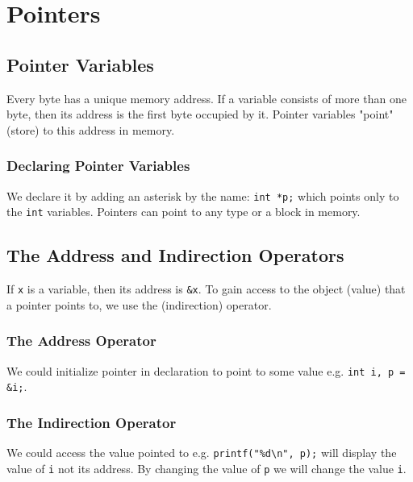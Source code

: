 \documentclass[openany]{book}
\begin{document}
    \chapter{Pointers}

    \section{Pointer Variables}
    Every byte has a unique memory address. If a variable consists of more than one byte, then its address is the first byte occupied by it. Pointer variables "point" (store) to this address in memory.

    \subsection*{Declaring Pointer Variables}
    We declare it by adding an asterisk by the name: \texttt{int *p;} which points only to the
    \texttt{int} variables. Pointers can point to any type or a block in memory.

    \section{The Address and Indirection Operators}
    If \texttt{x} is a variable, then its address is \texttt{\&x}. To gain access to the object
    (value) that a pointer points to, we use the \texttt{} (indirection) operator.

    \subsection*{The Address Operator}
    We could initialize pointer in declaration to point to some value e.g. \texttt{int i, p = \&i;}.

    \subsection*{The Indirection Operator}
    We could access the value pointed to e.g. \texttt{printf("\%d\textbackslash n", p);} will
    display the value of \texttt{i} not its address. By changing the value of \texttt{p} we will
    change the value \texttt{i}.
\end{document}
